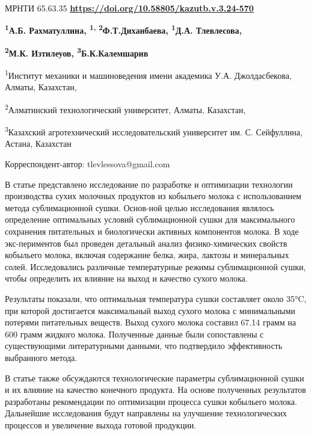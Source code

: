 \newpage
МРНТИ 65.63.35
\hfill {\bfseries \href{https://doi.org/10.58805/kazutb.v.3.24-570}{https://doi.org/10.58805/kazutb.v.3.24-570}}

\begin{center}
{\bfseries \textsuperscript{1}А.Б. Рахматуллина, \textsuperscript{1,
2}Ф.Т.Диханбаева, \textsuperscript{1}Д.А. Тлевлесова\envelope, }

{\bfseries \textsuperscript{2}М.К. Изтилеуов, \textsuperscript{3}Б.К.Калемшарив}

\textsuperscript{1}Институт механики и машиноведения имени академика
У.А. Джолдасбекова, Алматы, Казахстан,

\textsuperscript{2}Алматинский технологический университет, Алматы,
Казахстан,

\textsuperscript{3}Казахский агротехнический исследовательский
университет им. С. Сейфуллина, Астана, Казахстан
\end{center}

\envelope Корреспондент-автор: tlevlessova@gmail.com\vspace{0.5cm}

В статье представлено исследование по разработке и оптимизации
технологии производства сухих молочных продуктов из кобыльего молока с
использованием метода сублимационной сушки. Основ-ной целью исследования
являлось определение оптимальных условий сублимационной сушки для
максимального сохранения питательных и биологически активных компонентов
молока. В ходе экс-периментов был проведен детальный анализ
физико-химических свойств кобыльего молока, включая содержание белка,
жира, лактозы и минеральных солей. Исследовались различные температурные
режимы сублимационной сушки, чтобы определить их влияние на выход и
качество сухого молока.

Результаты показали, что оптимальная температура сушки составляет около
35°C, при которой достигается максимальный выход сухого молока с
минимальными потерями питательных веществ. Выход сухого молока составил
67.14 грамм на 600 грамм жидкого молока. Полученные данные были
сопоставлены с существующими литературными данными, что подтвердило
эффективность выбранного метода.

В статье также обсуждаются технологические параметры сублимационной
сушки и их влияние на качество конечного продукта. На основе полученных
результатов разработаны рекомендации по оптимизации процесса сушки
кобыльего молока. Дальнейшие исследования будут направлены на улучшение
технологических процессов и увеличение выхода готовой продукции.

